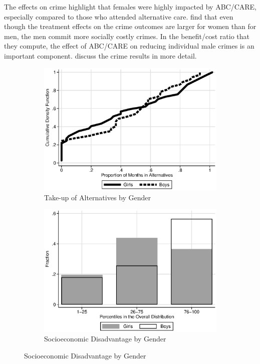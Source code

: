 The effects on crime highlight that females were highly impacted by ABC/CARE, especially compared to those who attended alternative care. \citet{Garcia_Heckman_Leaf_etal_2017_Comp_CBA_Unpublished} find that even though the treatment effects on the crime outcomes are larger for women than for men, the men commit more socially costly crimes. In the benefit/cost ratio that they compute, the effect of ABC/CARE on reducing individual male crimes is an important component. \citet{Garcia_etal_2019_ECE_IMHJ} discuss the crime results in more detail.


\begin{figure}
\centering
\caption{Gender and Baseline Socioeconomic Disadvantage in the Control Group} \label{figure:socdis}
\begin{subfigure}[h]{0.4\textwidth}
	\centering
	\caption{Take-up of Alternatives by Gender} \label{figure:altgender}
	\includegraphics[width=\textwidth]{output/abccare_controlcontamination_boysgirls}
\end{subfigure}%
\begin{subfigure}[h]{0.4\textwidth}
	\centering
	\caption{Socioeconomic Disadvantage by Gender} \label{figure:disadgender}
	\includegraphics[width=\textwidth]{output/factorbase_girlsboyscompare}

\end{subfigure}
\end{figure}
